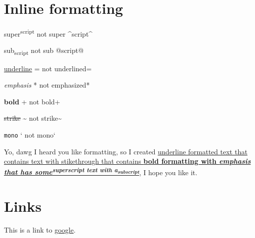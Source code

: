 \section{\label{inline-formatting}Inline formatting}
\par super\textsuperscript{script} not super {\textasciicircum}script{\textasciicircum}
\par sub\textsubscript{script} not sub @script@
\par \ul{underline}  = not underlined=
\par \emph{emphasis} * not emphasized*
\par \textbf{bold} + not bold+
\par \st{strike} {\textasciitilde} not strike{\textasciitilde}
\par \texttt{mono} ` not mono`
\par Yo, dawg I heard you like formatting, so I created \ul{underline formatted text that contains text with stikethrough that contains \textbf{bold formatting with \emph{emphasis that has some\textsuperscript{superscript text with a\textsubscript{subscript}}}}}, I hope you like it.
\section{\label{links}Links}
\par This is a link to \href{https://www.google.com}{google}. 